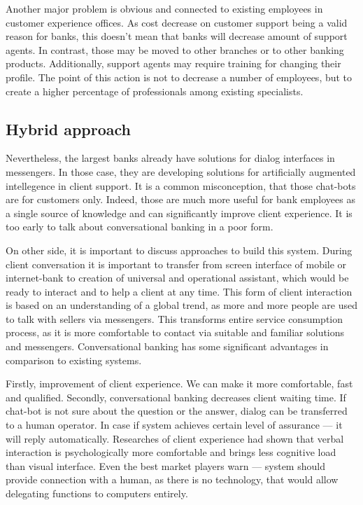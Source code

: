 Another major problem is obvious and connected to existing employees in customer experience offices.
As cost decrease on customer support being a valid reason for banks, this doesn't mean that banks will decrease amount of support agents.
In contrast, those may be moved to other branches or to other banking products.
Additionally, support agents may require training for changing their profile.
The point of this action is not to decrease a number of employees, but to create a higher percentage of professionals among existing specialists.

\subsection{Hybrid approach}

Nevertheless, the largest banks already have solutions for dialog interfaces in messengers.
In those case, they are developing solutions for artificially augmented intellegence in client support.
It is a common misconception, that those chat-bots are for customers only.
Indeed, those are much more useful for bank employees as a single source of knowledge and can significantly improve client experience.
It is too early to talk about conversational banking in a poor form.

On other side, it is important to discuss approaches to build this system.
During client conversation it is important to transfer from screen interface of mobile or internet-bank to creation of universal and operational assistant, which would be ready to interact and to help a client at any time.
This form of client interaction is based on an understanding of a global trend, as more and more people are used to talk with sellers via messengers. 
This transforms entire service consumption process, as it is more comfortable to contact via suitable and familiar solutions and messengers.
Conversational banking has some significant advantages in comparison to existing systems.

Firstly, improvement of client experience. 
We can make it more comfortable, fast and qualified.
Secondly, conversational banking decreases client waiting time. If chat-bot is not sure about the question or the answer, dialog can be transferred to a human operator.
In case if system achieves certain level of assurance — it will reply automatically.
Researches of client experience had shown that verbal interaction is psychologically more comfortable and brings less cognitive load than visual interface.
Even the best market players warn — system should provide connection with a human, as there is no technology, that would allow delegating functions to computers entirely.
\cite{ways_ai_transforming_bi}

